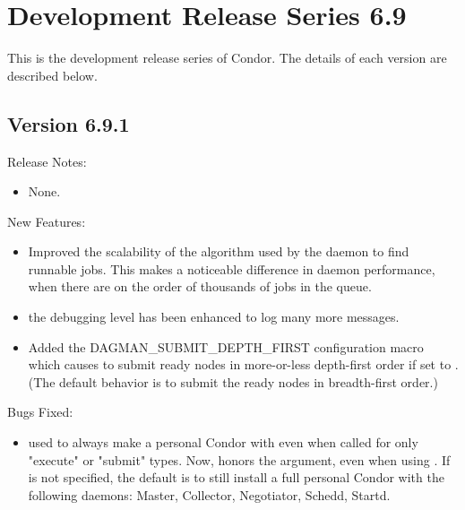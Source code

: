 \section{\label{sec:History-6-9}Development Release Series 6.9}

This is the development release series of Condor.
The details of each version are described below.

\subsection*{\label{sec:New-6-9-1}Version 6.9.1}

\noindent Release Notes:

\begin{itemize}

\item None.

\end{itemize}

\noindent New Features:

\begin{itemize}

\item Improved the scalability of the algorithm used by 
the  daemon to find runnable jobs.
This makes a noticeable difference in  daemon performance,
when there are on the order of thousands of jobs in the queue.

\item the  debugging level has been enhanced to
log many more messages. 

\item Added the DAGMAN\_SUBMIT\_DEPTH\_FIRST configuration macro which
causes  to submit ready nodes in more-or-less depth-first
order if set to .  (The default behavior is to submit
the ready nodes in breadth-first order.)

\end{itemize}

\noindent Bugs Fixed:

\begin{itemize}

\item {} used to always make a personal Condor with
 even when  called for only "execute" or
"submit" types.  Now,  honors the 
argument, even when using .
If  is not specified, the default is to still install a
full personal Condor with the following daemons: Master, Collector,
Negotiator, Schedd, Startd. 

\end{itemize}

